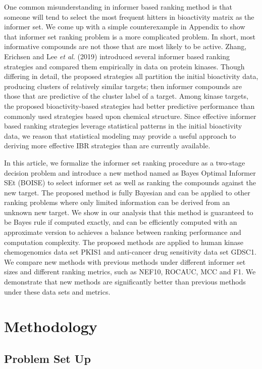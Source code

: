 \documentclass[12pt]{article}
\begin{document}
One common misunderstanding in informer based ranking method is that someone will tend to select the most frequent hitters in bioactivity matrix as the informer set. We come up with a simple counterexample in Appendix to show that informer set ranking problem is a more complicated problem. In short, most informative compounds are not those that are most likely to be active. Zhang, Erichsen and Lee {\em et al.} (2019) introduced several informer based ranking strategies and compared
them empirically in data on protein kinases. Though differing in detail,
the proposed strategies all partition the initial
bioactivity data, producing  clusters of relatively similar targets; 
then informer compounds are  those that are predictive of the cluster label of a target.  Among kinase targets, the proposed bioactivity-based strategies had better predictive
performance than commonly used strategies based upon chemical
structure.   Since effective informer based ranking strategies leverage statistical
patterns in the initial bioactivity data, we reason that
statistical modeling may provide a useful approach to deriving
more effective IBR strategies than are currently available. 

In this article, we formalize the informer set ranking procedure as a two-stage decision problem and introduce a new method named as Bayes Optimal Informer SEt (BOISE) to select informer set as well as ranking the compounds against the new target.  The proposed method is fully Bayesian and can be applied to other ranking problems where only limited information can be derived from an unknown new target. We show in our analysis that this method is guaranteed to be Bayes rule if computed exactly, and can be efficiently computed with an approximate version to achieves a balance between ranking performance and computation complexity.  The proposed methods are applied to human  kinase  chemogenomics  data  set PKIS1 and anti-cancer drug sensitivity data set GDSC1. We compare new methods with previous methods under different informer set sizes and different ranking metrics, such as NEF10, ROCAUC, MCC and F1. We demonstrate that new methods are significantly better than previous methods under these data sets and metrics.


\section{Methodology}

\subsection{Problem Set Up}
\end{document}
